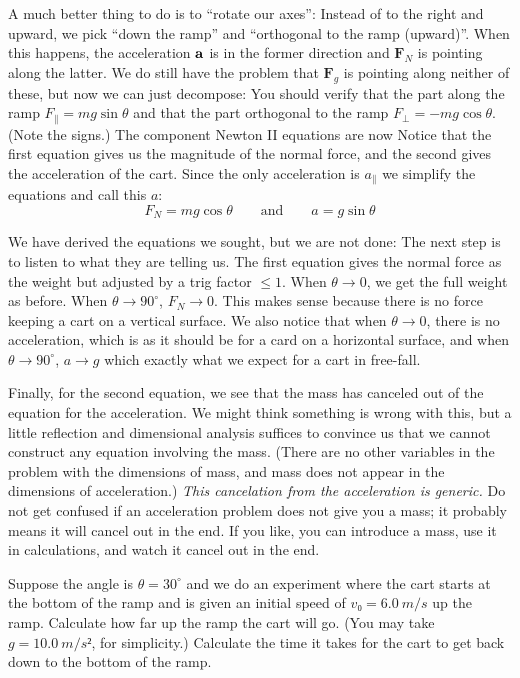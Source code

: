 A much better thing to do is to “rotate our axes”: Instead of to the right and upward, we pick “down the ramp” and “orthogonal to the ramp (upward)”. When this happens, the acceleration $\bf a$ is in the former direction and $𝐅_N$ is pointing along the latter. We do still have the problem that $𝐅_g$ is pointing along neither of these, but now we can just decompose: You should verify that the part along the ramp $F_\parallel = mg \sin θ$ and that the part orthogonal to the ramp $F_⊥ = - mg \cos θ$. (Note the signs.) The component Newton II equations are now 
Notice that the first equation gives us the magnitude of the normal force, and the second gives the acceleration of the cart.
Since the only acceleration is $a_\parallel $ we simplify the equations and call this $a$:
$$
F_N  = mg \cos θ
	\quad \quad \mathrm{and} \quad \quad 
a = g \sin θ
$$

We have derived the equations we sought, but we are not done: The next step is to listen to what they are telling us. 
The first equation gives the normal force as the weight but adjusted by a trig factor $≤ 1$. When $θ → 0$, we get the full weight as before. When $θ → 90^∘$, $F_N→ 0$. This makes sense because there is no force keeping a cart on a vertical surface. 
We also notice that when $θ→0$, there is no acceleration, which is as it should be for a card on a horizontal surface, and when $θ → 90^∘$, $a→ g$ which exactly what we expect for a cart in free-fall. 

Finally, for the second equation, we see that the mass has canceled out of the equation for the acceleration. We might think something is wrong with this, but a little reflection and dimensional analysis suffices to convince us that we cannot construct any equation involving the mass. (There are no other variables in the problem with the dimensions of mass, and mass does not appear in the dimensions of acceleration.) {\em This cancelation from the acceleration is generic.} Do not get confused if an acceleration problem does not give you a mass; it probably means it will cancel out in the end. If you like, you can introduce a mass, use it in calculations, and watch it cancel out in the end. 

\begin{exercise}
Suppose the angle is $θ = 30^∘$ and we do an experiment where the cart starts at the bottom of the ramp and is given an initial speed of $v₀ = 6.0\ m/s$ up the ramp. Calculate how far up the ramp the cart will go. (You may take $g = 10.0\ m/s²$, for simplicity.) Calculate the time it takes for the cart to get back down to the bottom of the ramp. 
\end{exercise}

